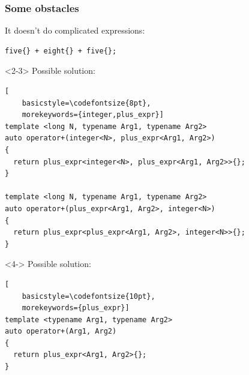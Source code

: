 \documentclass[14pt]{beamer}
\begin{document}
\begin{frame}[fragile]
  \frametitle{Some obstacles}
  
  It doesn't do complicated expressions:
  \begin{lstlisting}[basicstyle=\codefontsize{14pt}]
  five{} + eight{} + five{};
  \end{lstlisting}

  \vspace{.2cm}

  \begin{overlayarea}{\textwidth}{5cm}
  \begin{onlyenv}<2-3>
  Possible solution:
  \begin{lstlisting}[
    basicstyle=\codefontsize{8pt},
    morekeywords={integer,plus_expr}]
template <long N, typename Arg1, typename Arg2>
auto operator+(integer<N>, plus_expr<Arg1, Arg2>)
{
  return plus_expr<integer<N>, plus_expr<Arg1, Arg2>>{};
}

template <long N, typename Arg1, typename Arg2>
auto operator+(plus_expr<Arg1, Arg2>, integer<N>)
{
  return plus_expr<plus_expr<Arg1, Arg2>, integer<N>>{};
}
  \end{lstlisting}
  \end{onlyenv}

  \begin{onlyenv}<4->
  Possible solution:
  \begin{lstlisting}[
    basicstyle=\codefontsize{10pt},
    morekeywords={plus_expr}]
template <typename Arg1, typename Arg2>
auto operator+(Arg1, Arg2)
{
  return plus_expr<Arg1, Arg2>{};
}
  \end{lstlisting}
  \end{onlyenv}

  \end{overlayarea}

  \nointerlineskip

\end{frame}
\end{document}
